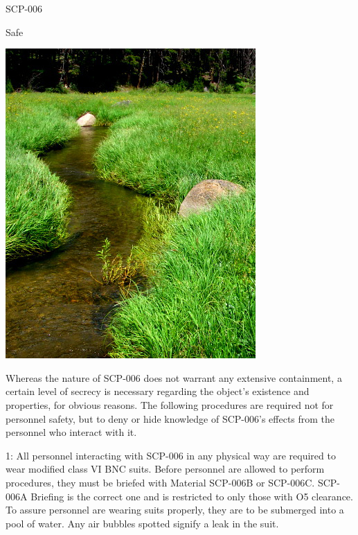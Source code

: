 \begin{flushleft}
\end{flushleft}

 SCP-006

 Safe

\begin{center}
\includegraphics[scale=0.55]{scp/006.jpg}
\end{center}

 Whereas the nature of SCP-006 does not warrant any extensive containment, a certain level of secrecy is necessary regarding the object's existence and properties, for obvious reasons. The following procedures are required not for personnel safety, but to deny or hide knowledge of SCP-006's effects from the personnel who interact with it.

1: All personnel interacting with SCP-006 in any physical way are required to wear modified class VI BNC suits. Before personnel are allowed to perform procedures, they must be briefed with Material SCP-006B or SCP-006C. SCP-006A Briefing is the correct one and is restricted to only those with O5 clearance. To assure personnel are wearing suits properly, they are to be submerged into a pool of water. Any air bubbles spotted signify a leak in the suit.

